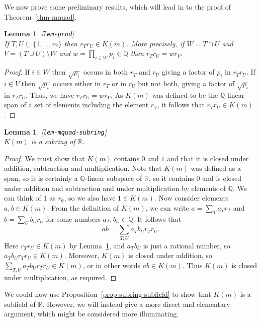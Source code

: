 \documentclass{amsart}
\newcommand{\lbl}[1]{\label{#1}\textup{[\texttt{#1}]}\ \\}
\newcommand{\lbl}{\label}
\newcommand{\Q}         {{\mathbb{Q}}}
\newcommand{\R}         {{\mathbb{R}}}
\newcommand{\sm}        {\setminus}
\newcommand{\sse}       {\subseteq}
\renewcommand{\:}{\colon}
\newtheorem{lemma}[theorem]{Lemma}
\theoremstyle{definition}
\begin{document}
We now prove some preliminary results, which will lead in to the proof
of Theorem~\ref{thm-mquad}.
\begin{lemma}\lbl{lem-prod}
 If $T,U\sse\{1,\dotsc,m\}$ then $r_Tr_U\in K(m)$.  More precisely, if 
 $W=T\cap U$ and $V=(T\cup U)\sm W$ and $w=\prod_{i\in W}p_i\in\Q$
 then $r_Tr_U=wr_V$.
\end{lemma}
\begin{proof}
 If $i\in W$ then $\sqrt{p_i}$ occurs in both $r_T$ and $r_U$ giving a
 factor of $p_i$ in $r_Tr_U$.  If $i\in V$ then $\sqrt{p_i}$ occurs
 either in $r_T$ or in $r_U$ but not both, giving a factor of
 $\sqrt{p_i}$ in $r_Tr_U$.  Thus, we have $r_Tr_U=wr_V$.  As $K(m)$
 was defined to be the $\Q$-linear span of a set of elements including
 the element $r_V$, it follows that $r_Tr_U\in K(m)$.
\end{proof}

\begin{lemma}\lbl{lem-mquad-subring}
 $K(m)$ is a subring of $\R$.
\end{lemma}
\begin{proof}
 We must show that $K(m)$ contains $0$ and $1$ and that it is closed
 under addition, subtraction and multiplication.  Note that $K(m)$ was
 defined as a span, so it is certainly a $\Q$-linear subspace of $\R$,
 so it contains $0$ and is closed under addition and subtraction and
 under multiplication by elements of $\Q$.  We can think of $1$ as
 $r_\emptyset$, so we also have $1\in K(m)$.  Now consider elements
 $a,b\in K(m)$.  From the definition of $K(m)$, we can write
 $a=\sum_Ta_Tr_T$ and $b=\sum_Ub_Ur_U$ for some numbers
 $a_T,b_U\in\Q$.  It follows that 
 \[ ab = \sum_{T,U} a_Tb_U r_Tr_U. \]
 Here $r_Tr_U\in K(m)$ by Lemma~\ref{lem-prod}, and $a_Tb_U$ is just a
 rational number, so $a_Tb_Ur_Tr_U\in K(m)$.  Moreover, $K(m)$ is
 closed under addition, so $\sum_{T,U}a_Tb_Ur_Tr_U\in K(m)$, or in
 other words $ab\in K(m)$.  Thus $K(m)$ is closed under
 multiplication, as required.
\end{proof}

We could now use Proposition~\ref{prop-subring-subfield} to show that
$K(m)$ is a subfield of $\R$.  However, we will instead give a more
direct and elementary argument, which might be considered more
illuminating. 
\end{document}
